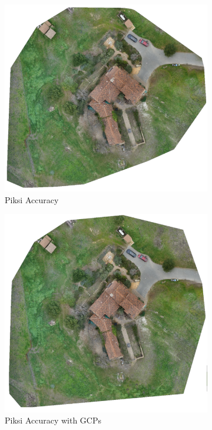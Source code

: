 \documentclass{article}
\begin{document}
\begin{figure}
\begin{subfigure}{.33\textwidth}
  \label{fig:sub1}
\end{subfigure}%
\begin{subfigure}{.33\textwidth}
  \centering
  \includegraphics[width=.75\linewidth]{images/orthomosaics/p_accurate.png}
  \caption{Piksi Accuracy }
  \label{fig:sub2}
\end{subfigure}
\begin{subfigure}{.33\textwidth}
  \centering
  \includegraphics[width=.75\linewidth]{images/orthomosaics/p_gcp_accurate.png}
  \caption{Piksi Accuracy with GCPs}
  \label{fig:sub1}
\end{subfigure}%
\begin{subfigure}{.33\textwidth}
  \centering

\end{subfigure}
\end{figure}
\end{document}
